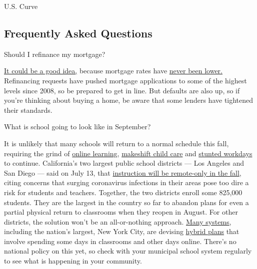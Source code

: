 U.S. Curve

\hypertarget{frequently-asked-questions}{%
\subsection{Frequently Asked
Questions}\label{frequently-asked-questions}}

 Should I refinance my mortgage?

\href{https://www.nytimes.com/article/coronavirus-money-unemployment.html}{It
could be a good idea,} because mortgage rates have
\href{https://www.nytimes.com/2020/07/16/business/mortgage-rates-below-3-percent.html}{never
been lower.} Refinancing requests have pushed mortgage applications to
some of the highest levels since 2008, so be prepared to get in line.
But defaults are also up, so if you're thinking about buying a home, be
aware that some lenders have tightened their standards.

 What is school going to look like in September?

It is unlikely that many schools will return to a normal schedule this
fall, requiring the grind of
\href{https://www.nytimes.com/2020/06/05/us/coronavirus-education-lost-learning.html}{online
learning},
\href{https://www.nytimes.com/2020/05/29/us/coronavirus-child-care-centers.html}{makeshift
child care} and
\href{https://www.nytimes.com/2020/06/03/business/economy/coronavirus-working-women.html}{stunted
workdays} to continue. California's two largest public school districts
--- Los Angeles and San Diego --- said on July 13, that
\href{https://www.nytimes.com/2020/07/13/us/lausd-san-diego-school-reopening.html}{instruction
will be remote-only in the fall}, citing concerns that surging
coronavirus infections in their areas pose too dire a risk for students
and teachers. Together, the two districts enroll some 825,000 students.
They are the largest in the country so far to abandon plans for even a
partial physical return to classrooms when they reopen in August. For
other districts, the solution won't be an all-or-nothing approach.
\href{https://bioethics.jhu.edu/research-and-outreach/projects/eschool-initiative/school-policy-tracker/}{Many
systems}, including the nation's largest, New York City, are devising
\href{https://www.nytimes.com/2020/06/26/us/coronavirus-schools-reopen-fall.html}{hybrid
plans} that involve spending some days in classrooms and other days
online. There's no national policy on this yet, so check with your
municipal school system regularly to see what is happening in your
community.

